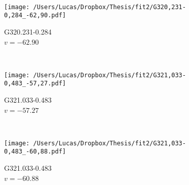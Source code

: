 \begin{figure*}[t]
\begin{subfigure}[t]{0.3\textwidth}
	\end{subfigure}
	~
	\begin{subfigure}[t]{0.3\textwidth}
		\texttt{[image: /Users/Lucas/Dropbox/Thesis/fit2/G320,231-0,284\_-62,90.pdf]}
		\caption[]{G320.231-0.284\\$v=-62.90$\,\kms}
	\end{subfigure}
	~
	\begin{subfigure}[t]{0.3\textwidth}
		\texttt{[image: /Users/Lucas/Dropbox/Thesis/fit2/G321,033-0,483\_-57,27.pdf]}
		\caption[]{G321.033-0.483\\$v=-57.27$\,\kms}
	\end{subfigure}
	~
	\begin{subfigure}[t]{0.3\textwidth}
		\texttt{[image: /Users/Lucas/Dropbox/Thesis/fit2/G321,033-0,483\_-60,88.pdf]}
		\caption[]{G321.033-0.483\\$v=-60.88$\,\kms}
	\end{subfigure}
	~
\end{figure*}
\clearpage
